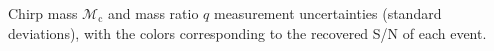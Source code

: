 \label{fig:mass_std_snr} Chirp mass $\mathcal{M}_\mathrm{c}$ and mass ratio $q$ measurement uncertainties (standard deviations), with the colors corresponding to the recovered S/N of each event.